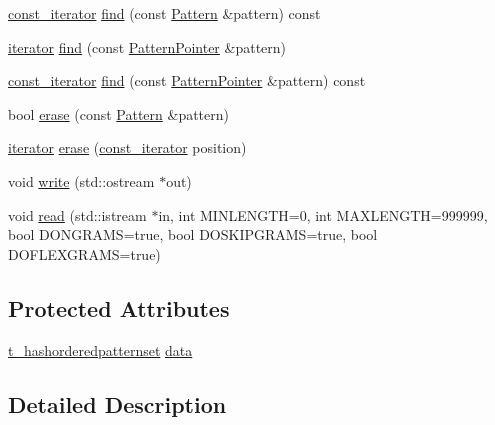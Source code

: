 \begin{DoxyCompactItemize}
\item 
\hyperlink{classHashOrderedPatternSet_a5e1bbb1c4ef5ee0937bc0d5251a8d97e}{const\+\_\+iterator} \hyperlink{classHashOrderedPatternSet_a1c4db04fcfa32faf3f807f40bc52f602}{find} (const \hyperlink{classPattern}{Pattern} \&pattern) const 
\item 
\hyperlink{classHashOrderedPatternSet_a3191eb8aa122dfe2bf819d37468bd0b6}{iterator} \hyperlink{classHashOrderedPatternSet_a90e6642ea5198c48bb23af9cee8f3b76}{find} (const \hyperlink{classPatternPointer}{Pattern\+Pointer} \&pattern)
\item 
\hyperlink{classHashOrderedPatternSet_a5e1bbb1c4ef5ee0937bc0d5251a8d97e}{const\+\_\+iterator} \hyperlink{classHashOrderedPatternSet_af718bb8098b11ce4794815ccdf449ac6}{find} (const \hyperlink{classPatternPointer}{Pattern\+Pointer} \&pattern) const 
\item 
bool \hyperlink{classHashOrderedPatternSet_ab48e2380fcc00d9dc0ef01d9217fb5e6}{erase} (const \hyperlink{classPattern}{Pattern} \&pattern)
\item 
\hyperlink{classHashOrderedPatternSet_a3191eb8aa122dfe2bf819d37468bd0b6}{iterator} \hyperlink{classHashOrderedPatternSet_a6240dd699062a02b09811935517edab2}{erase} (\hyperlink{classHashOrderedPatternSet_a5e1bbb1c4ef5ee0937bc0d5251a8d97e}{const\+\_\+iterator} position)
\item 
void \hyperlink{classHashOrderedPatternSet_a5410dc1022729fe531e7ef7dcd0e845c}{write} (std\+::ostream $\ast$out)
\item 
void \hyperlink{classHashOrderedPatternSet_ae4f18bc4f126da615a0ec194fe8f24b0}{read} (std\+::istream $\ast$in, int M\+I\+N\+L\+E\+N\+G\+T\+H=0, int M\+A\+X\+L\+E\+N\+G\+T\+H=999999, bool D\+O\+N\+G\+R\+A\+M\+S=true, bool D\+O\+S\+K\+I\+P\+G\+R\+A\+M\+S=true, bool D\+O\+F\+L\+E\+X\+G\+R\+A\+M\+S=true)
\end{DoxyCompactItemize}
\subsection*{Protected Attributes}
\begin{DoxyCompactItemize}
\item 
\hyperlink{patternstore_8h_a95f03de9f728d05eb31111e2dbdac6a7}{t\+\_\+hashorderedpatternset} \hyperlink{classHashOrderedPatternSet_a04f495b51e93c8f7d6798623398e5e61}{data}
\end{DoxyCompactItemize}


\subsection{Detailed Description}
